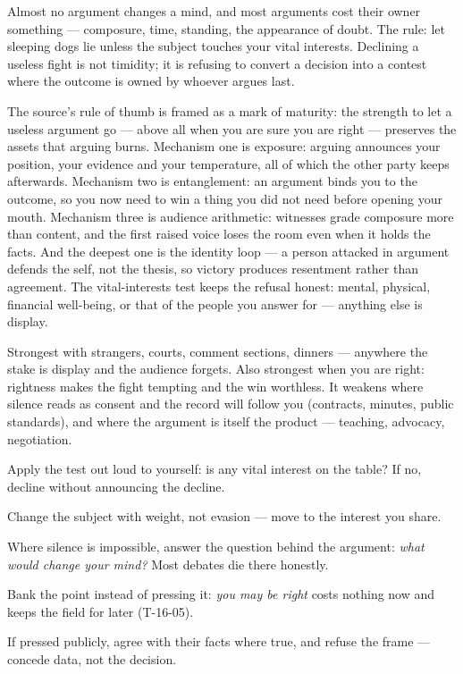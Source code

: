 \begin{core}
Almost no argument changes a mind, and most arguments cost their owner something --- composure, time, standing, the appearance of doubt. The rule: let sleeping dogs lie unless the subject touches your vital interests. Declining a useless fight is not timidity; it is refusing to convert a decision into a contest where the outcome is owned by whoever argues last.
\end{core}
\begin{mechanism}
The source's rule of thumb is framed as a mark of maturity: the strength to let a useless argument go --- above all when you are sure you are right --- preserves the assets that arguing burns. Mechanism one is exposure: arguing announces your position, your evidence and your temperature, all of which the other party keeps afterwards. Mechanism two is entanglement: an argument binds you to the outcome, so you now need to win a thing you did not need before opening your mouth. Mechanism three is audience arithmetic: witnesses grade composure more than content, and the first raised voice loses the room even when it holds the facts. And the deepest one is the identity loop --- a person attacked in argument defends the self, not the thesis, so victory produces resentment rather than agreement. The vital-interests test keeps the refusal honest: mental, physical, financial well-being, or that of the people you answer for --- anything else is display.
\end{mechanism}
\begin{conditions}
Strongest with strangers, courts, comment sections, dinners --- anywhere the stake is display and the audience forgets. Also strongest when you are right: rightness makes the fight tempting and the win worthless. It weakens where silence reads as consent and the record will follow you (contracts, minutes, public standards), and where the argument is itself the product --- teaching, advocacy, negotiation.
\end{conditions}
\begin{application}
  \item Apply the test out loud to yourself: is any vital interest on the table? If no, decline without announcing the decline.
  \item Change the subject with weight, not evasion --- move to the interest you share.
  \item Where silence is impossible, answer the question behind the argument: \emph{what would change your mind?} Most debates die there honestly.
  \item Bank the point instead of pressing it: \emph{you may be right} costs nothing now and keeps the field for later (T-16-05).
  \item If pressed publicly, agree with their facts where true, and refuse the frame --- concede data, not the decision.
\end{application}
